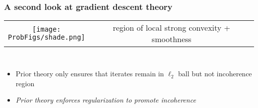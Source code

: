 \documentclass[compress,
mathserif,wide,%
]{beamer}
\newcommand{\ProbFigs}{figure}
\begin{document}
\begin{frame}
	\frametitle{A second look at gradient descent theory}


\begin{center}
	\begin{tabular}{cc}
 	 	\texttt{[image: \\ProbFigs/shade.png]} 	&  region of local strong convexity + smoothness \tabularnewline
	\end{tabular} 
\end{center}

\vspace{-1em}

\begin{columns}

\begin{column}{0.38\textwidth}
\begin{figure}
\end{figure}
\end{column}

\begin{column}{0.42\textwidth}
\begin{figure}
\end{figure}
\end{column}

\end{columns}
\vfill
\begin{itemize}
  \itemsep0.5em
  \item  Prior theory only ensures that iterates  remain in $\ell_2$ ball but not incoherence region
  \item<9-> {\em Prior theory enforces regularization to promote incoherence}
\end{itemize}


\end{frame}
\end{document}
